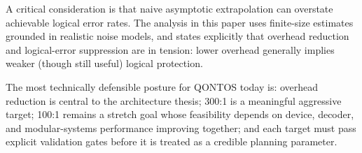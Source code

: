 \documentclass[conference]{IEEEtran}
\begin{document}
A critical consideration is that naive asymptotic extrapolation can overstate achievable logical error rates. The analysis in this paper uses finite-size estimates grounded in realistic noise models, and states explicitly that overhead reduction and logical-error suppression are in tension: lower overhead generally implies weaker (though still useful) logical protection.

The most technically defensible posture for QONTOS today is: overhead reduction is central to the architecture thesis; 300:1 is a meaningful aggressive target; 100:1 remains a stretch goal whose feasibility depends on device, decoder, and modular-systems performance improving together; and each target must pass explicit validation gates before it is treated as a credible planning parameter.


\end{document}
